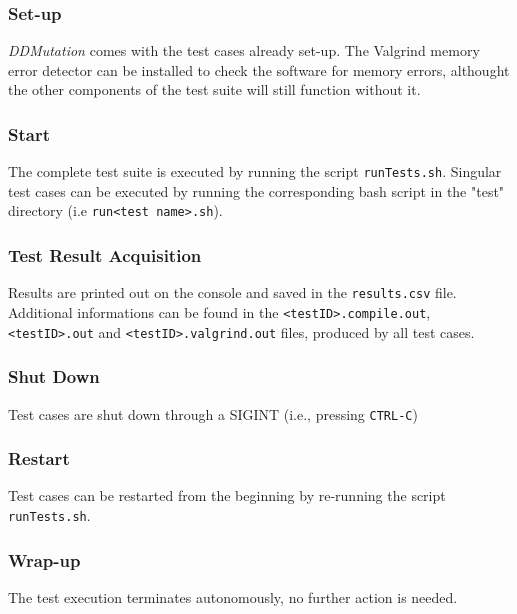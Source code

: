 \subsubsection{Set-up}
\emph{DDMutation} comes with the test cases already set-up.  The Valgrind memory error detector can be installed to check the software for memory errors, althought the other components of the test suite will still function without it.
\subsubsection{Start}
The complete test suite is executed by running the script \texttt{runTests.sh}.
Singular test cases can be executed by running the corresponding bash script in the "test" directory (i.e \texttt{run<test name>.sh}).
\subsubsection{Test Result Acquisition}
Results are printed out on the console and saved in the \texttt{results.csv} file.
Additional informations can be found in the \texttt{<testID>.compile.out},
\texttt{<testID>.out} and \texttt{<testID>.valgrind.out} files, produced by all test cases.
\subsubsection{Shut Down}
Test cases are shut down through a SIGINT (i.e., pressing \texttt{CTRL-C})
\subsubsection{Restart}
Test cases can be restarted from the beginning by re-running the script \texttt{runTests.sh}.
\subsubsection{Wrap-up}
The test execution terminates autonomously, no further action is needed.
